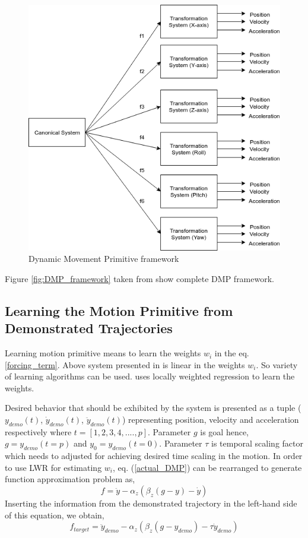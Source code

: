 \begin{figure}[H]
	\includegraphics[width=\textwidth]{images/DMP_6DOF.png}
	\caption{Dynamic Movement Primitive framework}
	\label{fig:DMP_6DOF}
\end{figure}


\par Figure \ref{fig:DMP_framework} taken from \cite{ijspeert2013dynamical} show complete DMP framework. 

\subsection{Learning the Motion Primitive from Demonstrated Trajectories}
\par Learning motion primitive means to learn the weights $w_{i}$ in the eq. \ref{forcing_term}. Above system presented in \cite{ijspeert2013dynamical} is linear in the weights $w_{i}$. So variety of learning algorithms can be used. \cite{ijspeert2013dynamical} uses locally weighted regression to learn the weights. 

Desired behavior that should be exhibited by the system is presented as a tuple ($y_{demo}(t)$, $\dot{y}_{demo}(t)$, $\ddot{y}_{demo}(t)$) representing position, velocity and acceleration respectively where $t = [1,2,3,4,....,p]$. Parameter $g$ is goal hence, $g = y_{demo}(t = p)$ and $y_{0} = y_{demo}(t = 0)$. Parameter $\tau$ is temporal scaling factor which needs to adjusted for achieving desired time scaling in the motion. In order to use LWR for estimating $w_{i}$, eq. (\ref{actual_DMP}) can be rearranged to generate function approximation problem as,
\begin{equation}
f = \ddot{y} - \alpha_{z}(\beta_{z}(g - y) - \dot{y})
\end{equation}
Inserting the information from the demonstrated trajectory in the left-hand side of this equation, we obtain,
\begin{equation}
f_{target} = \ddot{y}_{demo} - \alpha_{z}(\beta_{z}(g - y_{demo}) - \tau\dot{y}_{demo})
\end{equation}

